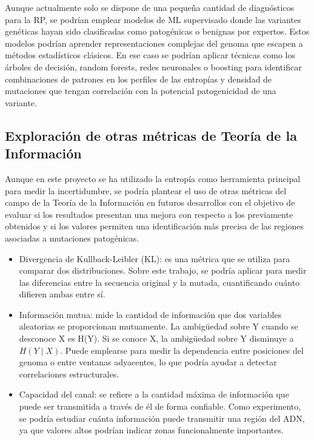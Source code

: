 \documentclass[11pt,spanish,listoffigures,listoftables]{tfgetsinf}
\begin{document}
Aunque actualmente solo se dispone de una pequeña cantidad de diagnósticos para la \acs{RP}, se podrían emplear modelos de ML supervisado donde las variantes genéticas hayan sido clasificadas como patogénicas o benignas por expertos. Estos modelos podrían aprender representaciones complejas del genoma que escapen a métodos estadísticos clásicos. En ese caso se podrían aplicar técnicas como los árboles de decisión, random forests, redes neuronales o boosting para identificar combinaciones de patrones en los perfiles de las entropías y densidad de mutaciones que tengan correlación con la potencial patogenicidad de una variante.


\subsection{Exploración de otras métricas de Teoría de la Información}

Aunque en este proyecto se ha utilizado la entropía como herramienta principal para medir la incertidumbre, se podría plantear el uso de otras métricas del campo de la Teoría de la Información en futuros desarrollos con el objetivo de evaluar si los resultados presentan una mejora con respecto a los previamente obtenidos y si los valores permiten una identificación más precisa de las regiones asociadas a mutaciones patogénicas.

\begin{itemize}
   \item Divergencia de Kullback-Leibler (KL): es una métrica que se utiliza para comparar dos distribuciones. Sobre este trabajo, se podría aplicar para medir las diferencias entre la secuencia original y la mutada, cuantificando cuánto difieren ambas entre sí\cite{BUH}.
   \item Información mutua: mide la cantidad de información que dos variables aleatorias se proporcionan mutuamente. La ambigüedad sobre Y cuando se desconoce X es H(Y). Si se conoce X, la ambigüedad sobre Y disminuye a \( H(Y \mid X) \). Puede emplearse para medir la dependencia entre posiciones del genoma o entre ventanas adyacentes, lo que podría ayudar a detectar correlaciones estructurales\cite{HUS}.
   \item Capacidad del canal: se refiere a la cantidad máxima de información que puede ser transmitida a través de él de forma confiable. Como experimento, se podría estudiar cuánta información puede transmitir una región del \acs{ADN}, ya que valores altos podrían indicar zonas funcionalmente importantes\cite{BLA}.\\
\end{itemize}
\end{document}
